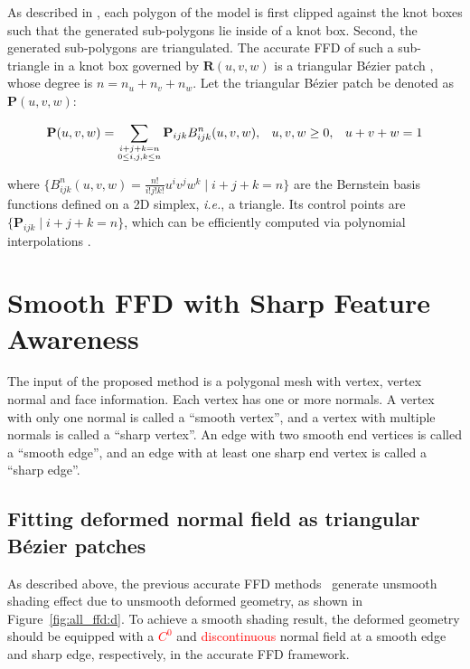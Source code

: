 \documentclass[3p]{elsarticle}
\begin{document}
As described in \cite{Feng98, Feng00, Cui14}, each polygon of the model is first clipped against the knot boxes such
that the generated sub-polygons lie inside of a knot box. Second, the generated sub-polygons are triangulated. The
accurate FFD of such a sub-triangle in a knot box governed by $\mathbf R(u,v,w)$ is a triangular B\'ezier patch
\cite{Feng98, Feng00}, whose degree is $n=n_u+n_v+n_w$. Let the triangular B\'ezier patch be denoted as ${\mathbf
P}(u,v,w)$:

\begin{equation}
	\footnotesize
	{\mathbf P}(u,v,w)
	= \sum_{\substack{i+j+k=n \\ 0\leq i,j,k\leq n}} {\mathbf P}_{ijk}B^n_{ijk}(u,v,w), \hspace{8 pt} u,v,w\ge0,
		\hspace{8 pt}u+v+w=1
	\label{equ:Puvw}
\end{equation}

\noindent where $\{B_{ijk}^n(u,v,w)=\frac{n!}{i!j!k!}u^iv^jw^k \mid i+j+k=n\}$ are the Bernstein basis functions
defined on a 2D simplex, \textit{i.e.}, a triangle. Its control points are $\{\mathbf P_{ijk} \mid i+j+k=n\}$, which
can be efficiently computed via polynomial interpolations \cite{Feng00}.


\section{Smooth FFD with Sharp Feature Awareness}

The input of the proposed method is a polygonal mesh with vertex, vertex normal and face information. Each vertex has
one or more normals. A vertex with only one normal is called a ``smooth vertex'', and a vertex with multiple normals is
called a ``sharp vertex''. An edge with two smooth end vertices is called a ``smooth edge'', and an edge with at least one
sharp end vertex is called a ``sharp edge''.

\subsection{Fitting deformed normal field as triangular B\'ezier patches}
\label{sec:normal_fitting}

As described above, the previous accurate FFD methods~\cite{Cui13, Cui14} generate unsmooth shading effect due to
unsmooth deformed geometry, as shown in Figure~\ref{fig:all_ffd:d}. To achieve a smooth shading result, the deformed
geometry should be equipped with a \textcolor{red}{$C^0$} and \textcolor{red}{discontinuous} normal field at a smooth
edge and sharp edge, respectively, in the accurate FFD framework.
\end{document}
